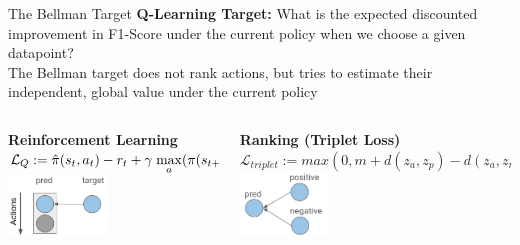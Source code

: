 \documentclass[aspectratio=169, 11pt, invertlogo]{ismll-slides}
\begin{document}
\begin{frame}[fragile]{The Bellman Target}
	\textbf{Q-Learning Target:}
	What is the expected discounted improvement in F1-Score under the current policy when we choose a given datapoint? \\ [2mm]
	The Bellman target does not rank actions, but tries to estimate their independent, global value under the current policy
	\vspace{5mm}
	\begin{columns}
		\begin{column}{.42\linewidth}
			\textbf{Reinforcement Learning} \\ 
			$\mathcal{L}_Q := \hat{\pi}(s_t, a_t) - r_t + \gamma \hspace{1mm} \underset{a}{\operatorname{max}}(\pi(s_{t+1}))$ \\
			\includegraphics[width=100px]{pics/bellman}
		\end{column}
		\hspace{1mm}
		\begin{column}{.55\linewidth}
			\textbf{Ranking (Triplet Loss)} \\ 
			$\mathcal{L}_{triplet} := max(0, m+d(z_a, z_p) - d(z_a, z_n))$ \\
			\includegraphics[width=88px]{pics/triplet}
		\end{column}
	\end{columns}
\end{frame}


\end{document}
